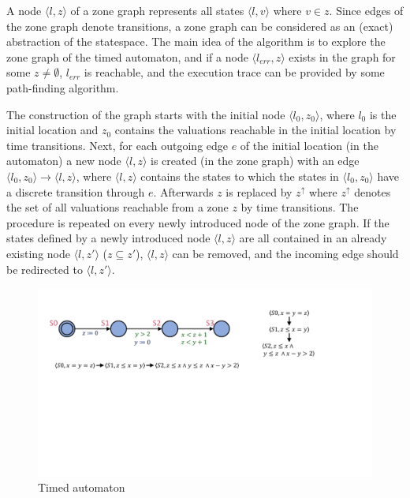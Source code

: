 A node $\langle l,z \rangle$ of a zone graph represents all states $\langle l,v \rangle$ where $v \in z$. Since edges of the zone graph denote transitions, a zone graph can be considered as an (exact) abstraction of the statespace. The main idea of the algorithm is to explore the zone graph of the timed automaton, and if a node $\langle l_{err},z \rangle$ exists in the graph for some $z \neq \emptyset$, $l_{err}$ is reachable, and the execution trace can be provided by some path-finding algorithm.

The construction of the graph starts with the initial node  $\langle l_0,z_0 \rangle$,
where $l_0$ is the initial location and $z_0$ contains the valuations reachable in the initial location by time transitions. 
Next, for each outgoing edge $e$ of the initial location (in the automaton) a new node  $\langle l,z \rangle$ is created (in the zone graph) with an edge
$\langle l_0,z_0 \rangle \to \langle l,z \rangle$, where $\langle l,z \rangle$ contains the states to which the states in $\langle l_0,z_0 \rangle$ have a discrete transition through $e$. Afterwards $z$ is replaced by $z^\uparrow$ where $z^\uparrow$ denotes the set of all valuations reachable from a zone $z$ by time transitions.  The procedure is repeated on every newly introduced node of the zone graph. If the states defined by a newly introduced node $\langle l,z \rangle$ are all contained in an already existing node $\langle l,z' \rangle$ ($z \subseteq z'$), $\langle l,z \rangle$ can be removed, and the incoming edge should be redirected to $\langle l,z' \rangle$.

\begin{figure} 
	\centering
	\includegraphics[width=.7\textwidth]{include/figures/splitexample_aut}
	\caption{Timed automaton}
	\label{fig:splitex}
\end{figure}

